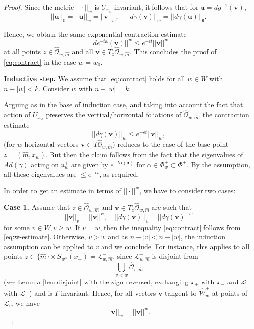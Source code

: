 \documentclass[12pt]{amsbook}%
\theoremstyle{definition}
\theoremstyle{remark}
\numberwithin{section}{chapter}
\numberwithin{subsection}{section}
\numberwithin{figure}{chapter}
\def\eps{\epsilon}
\def\cO{{\mathscr{O}}}
\def\cW{{\mathscr{W}}}
\def\ba{\mathbf{a}}
\def\bu{\mathbf{u}}
\def\bv{\mathbf{v}}
\def\ga{\gamma}
\def\al{\alpha}
\def\cL{{\mathscr{L}}}
\begin{document}
{{\begin{proof}
Since the metric 
$||\cdot||_w$ is $U_{x_w}$-invariant, it follows that for $\bu= dg^{-1}(\bv)$, 
$$
||\bu||_0=||\bu ||_w= ||\bv||_w, \quad  ||d\ga (\bv)||_w= ||d\ga (\bu)||_0. 
$$

Hence, we obtain the same exponential contraction estimate 
$$
||de^{-t\ba}(\bv)||^w \leqslant e^{-\epsilon t}  ||\bv||^w 
 $$
 at all points $z\in \hat{\cO}_{w, \hat{m}}$ 	and all $\bv \in T_z \hat{\cO}_{w, \hat{m}}$. This concludes the proof of \eqref{eq:contract} in the case $w=w_0$. 





\medskip 
{\bf Inductive step.} We assume that \eqref{eq:contract} holds for all $w\in W$ with $n-|w|<k$. Consider $w$ with $n-|w|=k$.  


Arguing as in the base of induction case, and taking into account the fact that action of $U_{x_w}$ 
preserves the vertical/horizontal foliations of $\hat{\cO}_{w,\hat{m}}$,   the contraction estimate 
\begin{equation}\label{eq:w-estimate} 
||d\ga(\bv)||_w\leqslant e^{-\eps t} ||\bv||_w,
\end{equation}
(for $w$-horizontal vectors $\bv\in T \hat{\cO}_{w,\hat{m}}$)  reduces to the case of the base-point $z= (\hat{m},x_w)$. But then the claim follows from the fact that the eigenvalues 
of $Ad(\ga)$ acting on ${\mathfrak u}^+_w$ are given by $e^{-t\al(\ba)}$ for $\al\in \Phi_w^+\subset \Phi^+$. By the assumption, all these eigenvalues are 
$\leqslant  e^{-\eps t}$, as required. 

In order to get an estimate in terms of $||\cdot||^w$, we have to consider two cases:  

{\bf Case 1.} Assume that $z\in \hat{\cO}_{w,\hat{m}}$ and $\bv\in T_z \hat{\cO}_{w,\hat{m}}$ are such that  
$$
||\bv||_v= ||\bv||^w, \quad ||d\ga(\bv)||_v= ||d\ga(\bv)||^w 
$$
for some $v\in W, v \geqslant w$. If $v = w$, then the inequality \eqref{eq:contract} follows from \eqref{eq:w-estimate}. Otherwise, $v> w$ and as $n- |v| < n-|w|$, the induction assumption can be applied to $v$ and we conclude.
For instance, this applies 
to all points $z\in \{ \hat{m} \} \times S_{w^\vee}(x_-)=\cL_{w,\hat{m}}^-$, since $\cL_{w, \hat{m}}^-$ is disjoint from 
$$
\bigcup_{v <  w} \hat{\cO}_{v, \hat{m}}
$$
(see Lemma \ref{lem:disjoint} with the sign reversed, exchanging $x_+$ with $x_-$ and $\mathcal{L}^+$ with $\cL^-$) and is $T$-invariant. Hence,  for all vectors $\bv$ tangent to $\hat{\cW}_w^+$ at points of $\cL_w^-$ we have
$$
||\bv||_w=||\bv||^w. 
$$


\end{proof}}}
\end{document}
